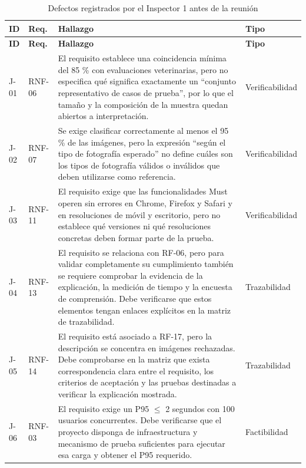 \documentclass[journal,onecolumn]{IEEEtran}
\begin{document}
	\begin{longtable}{C{1.0cm} L{1.7cm} L{6.3cm} L{2.0cm}}
		\caption{Defectos registrados por el Inspector 1 antes de la reunión}
		\label{tab:prep-jonathan}\\
		\toprule
		\textbf{ID} & \textbf{Req.} & \textbf{Hallazgo} & \textbf{Tipo} \\
		\midrule
		\endfirsthead
		\toprule
		\textbf{ID} & \textbf{Req.} & \textbf{Hallazgo} & \textbf{Tipo} \\
		\midrule
		\endhead
		\bottomrule
		\endfoot
		J-01 & RNF-06 &
		El requisito establece una coincidencia mínima del 85 \% con evaluaciones veterinarias, pero
		no especifica qué significa exactamente un ``conjunto representativo de casos de prueba'', por
		lo que el tamaño y la composición de la muestra quedan abiertos a interpretación. &
		Verificabilidad \\
		\addlinespace
		J-02 & RNF-07 &
		Se exige clasificar correctamente al menos el 95 \% de las imágenes, pero la expresión
		``según el tipo de fotografía esperado'' no define cuáles son los tipos de fotografía válidos
		o inválidos que deben utilizarse como referencia. & Verificabilidad \\
		\addlinespace
		J-03 & RNF-11 &
		El requisito exige que las funcionalidades Must operen sin errores en Chrome, Firefox y Safari
		y en resoluciones de móvil y escritorio, pero no establece qué versiones ni qué resoluciones
		concretas deben formar parte de la prueba. & Verificabilidad \\
		\addlinespace
		J-04 & RNF-13 &
		El requisito se relaciona con RF-06, pero para validar completamente su cumplimiento también
		se requiere comprobar la evidencia de la explicación, la medición de tiempo y la encuesta de
		comprensión. Debe verificarse que estos elementos tengan enlaces explícitos en la matriz de
		trazabilidad. & Trazabilidad \\
		\addlinespace
		J-05 & RNF-14 &
		El requisito está asociado a RF-17, pero la descripción se concentra en imágenes rechazadas.
		Debe comprobarse en la matriz que exista correspondencia clara entre el requisito, los
		criterios de aceptación y las pruebas destinadas a verificar la explicación mostrada. &
		Trazabilidad \\
		\addlinespace
		J-06 & RNF-03 &
		El requisito exige un P95 $\leq$ 2 segundos con 100 usuarios concurrentes. Debe verificarse
		que el proyecto disponga de infraestructura y mecanismo de prueba suficientes para ejecutar
		esa carga y obtener el P95 requerido. & Factibilidad \\

\end{longtable}
\end{document}

